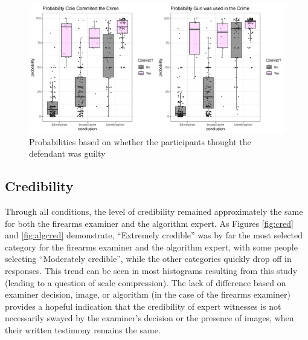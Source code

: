 \documentclass[print]{nuthesis}
\begin{document}
\begin{figure}

{\centering \includegraphics[width=\linewidth]{thesis_files/figure-latex/probguilt-1} 

}

\caption{Probabilities based on whether the participants thought the defendant was guilty}\label{fig:probguilt}
\end{figure}

\hypertarget{credibility}{%
\subsection{Credibility}\label{credibility}}

Through all conditions, the level of credibility remained approximately the same for both the firearms examiner and the algorithm expert.
As Figures \ref{fig:cred} and \ref{fig:algcred} demonstrate, ``Extremely credible'' was by far the most selected category for the firearms examiner and the algorithm expert, with some people selecting ``Moderately credible'', while the other categories quickly drop off in responses.
This trend can be seen in most histograms resulting from this study (leading to a question of scale compression).
The lack of difference based on examiner decision, image, or algorithm (in the case of the firearms examiner) provides a hopeful indication that the credibility of expert witnesses is not necessarily swayed by the examiner's decision or the presence of images, when their written testimony remains the same.
\end{document}
